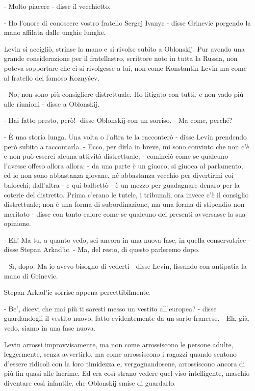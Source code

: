 - Molto piacere - disse il vecchietto. 

- Ho l'onore di conoscere vostro fratello Sergej Ivanyc - disse Grinevic porgendo la mano affilata dalle unghie lunghe. 

Levin si accigliò, strinse la mano e si rivolse subito a Oblonskij. Pur avendo una grande considerazione per il fratellastro, scrittore noto in tutta la Russia, non poteva sopportare che ci si rivolgesse a lui, non come Konstantin Levin ma come al fratello del famoso Koznyšev. 

- No, non sono più consigliere distrettuale. Ho litigato con tutti, e non vado più alle riunioni - disse a Oblonskij. 

- Hai fatto presto, però!- disse Oblonskij con un sorriso. - Ma come, perché? 

- È una storia lunga. Una volta o l'altra te la racconterò - disse Levin prendendo però subito a raccontarla. - Ecco, per dirla in breve, mi sono convinto che non c'è e non può esserci alcuna attività distrettuale; - cominciò come se qualcuno l'avesse offeso allora allora: - da una parte è un giuoco; si giuoca al parlamento, ed io non sono abbastanza giovane, né abbastanza vecchio per divertirmi coi balocchi; dall'altra - e qui balbettò - è un mezzo per guadagnare denaro per la coterie del distretto. Prima c'erano le tutele, i tribunali, ora invece c'è il consiglio distrettuale; non è una forma di subordinazione, ma una forma di stipendio non meritato - disse con tanto calore come se qualcuno dei presenti avversasse la sua opinione. 

- Eh! Ma tu, a quanto vedo, sei ancora in una nuova fase, in quella conservatrice - disse Stepan Arkad'ic. - Ma, del resto, di questo parleremo dopo. 

- Sì, dopo. Ma io avevo bisogno di vederti - disse Levin, fissando con antipatia la mano di Grinevic. 

Stepan Arkad'ic sorrise appena percettibilmente. 

- Be', dicevi che mai più ti saresti messo un vestito all'europea? - disse guardandogli il vestito nuovo, fatto evidentemente da un sarto francese. - Eh, già, vedo, siamo in una fase nuova. 

Levin arrossì improvvisamente, ma non come arrossiscono le persone adulte, leggermente, senza avvertirlo, ma come arrossiscono i ragazzi quando sentono d'essere ridicoli con la loro timidezza e, vergognandosene, arrossiscono ancora di più fin quasi alle lacrime. Ed era così strano vedere quel viso intelligente, maschio diventare così infantile, che Oblonskij smise di guardarlo. 

